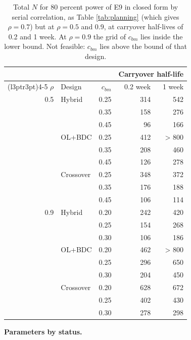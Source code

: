 \documentclass[
  11pt,
]{article}
\begin{document}
\begin{table}

\caption{\label{tab:planningrho}Total $N$ for 80 percent power of E9 in closed form by serial correlation, as Table \ref{tab:planning} (which gives $\rho = 0.7$) but at $\rho = 0.5$ and 0.9, at carryover half-lives of 0.2 and 1 week. At $\rho = 0.9$ the grid of $c_{bm}$ lies inside the lower bound. Not feasible: $c_{bm}$ lies above the bound of that design.}
\centering
\begin{tabular}[t]{rlrrr}
\toprule
\multicolumn{3}{c}{ } & \multicolumn{2}{c}{Carryover half-life} \\
\cmidrule(l{3pt}r{3pt}){4-5}
$\rho$ & Design & $c_{bm}$ & 0.2 week & 1 week\\
\midrule
0.5 & Hybrid & 0.25 & 314 & 542\\
 &  & 0.35 & 158 & 276\\
 &  & 0.45 & 96 & 166\\
 & OL+BDC & 0.25 & 412 & > 800\\
 &  & 0.35 & 208 & 460\\
 &  & 0.45 & 126 & 278\\
 & Crossover & 0.25 & 348 & 372\\
 &  & 0.35 & 176 & 188\\
 &  & 0.45 & 106 & 114\\
0.9 & Hybrid & 0.20 & 242 & 420\\
 &  & 0.25 & 154 & 268\\
 &  & 0.30 & 106 & 186\\
 & OL+BDC & 0.20 & 462 & > 800\\
 &  & 0.25 & 296 & 650\\
 &  & 0.30 & 204 & 450\\
 & Crossover & 0.20 & 628 & 672\\
 &  & 0.25 & 402 & 430\\
 &  & 0.30 & 278 & 298\\
\bottomrule
\end{tabular}
\end{table}

\textbf{Parameters by status.}
\end{document}
